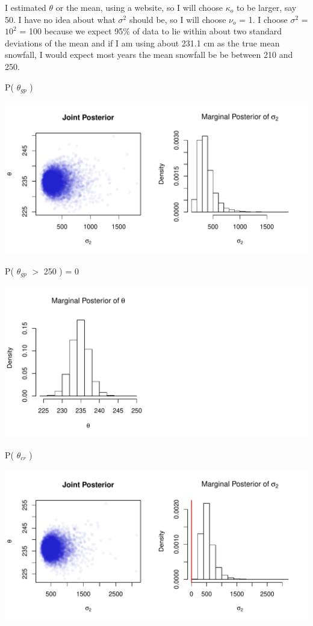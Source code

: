 \documentclass{article}\usepackage[]{graphicx}\usepackage[]{color}
\makeatletter
\def\maxwidth{ %
  \ifdim\Gin@nat@width>\linewidth
    \linewidth
  \else
    \Gin@nat@width
  \fi
}
\makeatother
\begin{document}
\begin{enumerate}
\begin{enumerate}
I estimated $\theta$ or the mean, using a website, so I will choose $\kappa_{o}$ to be larger, say 50. I have no idea about what $\sigma^{2}$ should be, so I will choose $\nu_{o}$ = 1. I choose $\sigma^{2}$ = $10^{2}$ = 100 because we expect 95\% of data to lie within about two standard deviations of the mean and if I am using about 231.1 cm as the true mean snowfall, I would expect most years the mean snowfall be be between 210 and 250.

\newpage

P( $\theta_{gp}$ )

{\centering \includegraphics[width=\maxwidth]{figure/prob7c1-1} 

}


P( $\theta_{gp}$ $>$ 250 ) = 0

{\centering \includegraphics[width=\maxwidth]{figure/prob7c1-2} 

}



\newpage

P( $\theta_{cr}$ )

{\centering \includegraphics[width=\maxwidth]{figure/prob7c2-1} 

}
\end{enumerate}
\end{enumerate}
\end{document}
